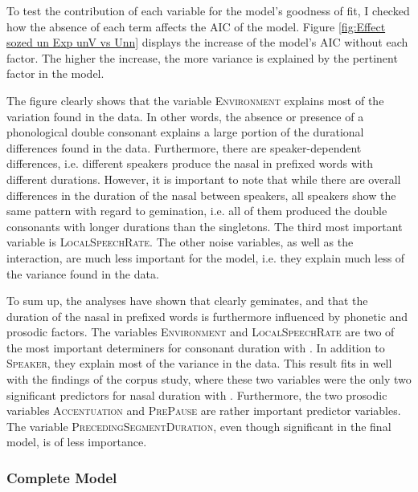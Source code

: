 To test the contribution of each variable for the model's goodness of fit, I checked how the absence of each term affects the AIC of the model. Figure \ref{fig:Effect sozed un Exp unV vs Unn} displays the increase of the model's AIC  without each factor. The higher the increase, the more variance is explained by the pertinent factor in the model.



The figure clearly shows that the variable \textsc{Environment} explains most of the variation found in the data. In other words, the absence or presence of a phonological double consonant explains a large portion of the durational differences found in the data.
Furthermore, there are speaker-dependent differences, i.e. different speakers produce the nasal in prefixed words with different durations. However, it is important to note that while there are overall differences in the duration of the nasal between speakers, all speakers show the same pattern with regard to gemination, i.e. all of them produced the double consonants with longer durations than the singletons. 
The third most important variable is \textsc{LocalSpeechRate}. The other noise variables, as well as the interaction, are much less important for the model, i.e. they explain much less of the variance found in the data.


To sum up, the analyses have shown that  clearly geminates, and that the duration of the nasal in prefixed words is furthermore influenced by phonetic and prosodic factors.
The variables \textsc{Environment} and \textsc{LocalSpeechRate} are two of the most important determiners for consonant duration with . In addition to \textsc{Speaker}, they explain most of the variance in the data. This result fits in well with the findings of the corpus study, where these two variables were the only two significant predictors for nasal duration with . 
Furthermore, the two prosodic variables \textsc{Accentuation} and \textsc{PrePause} are rather important predictor variables. The variable \textsc{PrecedingSegmentDuration}, even though significant in the final model, is of less importance. 



\subsubsection{Complete Model}

